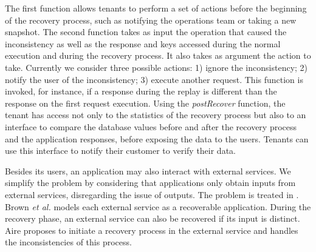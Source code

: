 The first function allows tenants to perform a set of actions before the beginning of the recovery process, such as notifying the operations team or taking a new snapshot. 
The second function takes as input the operation that caused the inconsistency as well as the response and keys accessed during the normal execution and during the recovery process. It also takes as argument the action to take. Currently we consider three possible actions: 1) ignore the inconsistency; 2) notify the user of the inconsistency; 3) execute another request. This function is invoked, for instance, if a response during the replay is different than the response on the first request execution.
Using the \textit{postRecover} function, the tenant has access not only to the statistics of the recovery process but also to an interface to compare the database values before and after the recovery process and the application responses, before exposing the data to the users. 
Tenants can use this interface to notify their customer to verify their data.

Besides its users, an application may also interact with external services. We simplify the problem by considering that applications only obtain inputs from external services, disregarding the issue of outputs. The problem is treated in \cite{undoForOperators,aire}. Brown \textit{et al.} \cite{Brown_spheres} models each external service as a recoverable application. During the recovery phase, an external service can also be recovered if its input is distinct. Aire \cite{aire} proposes to initiate a recovery process in the external service and handles the inconsistencies of this process.




